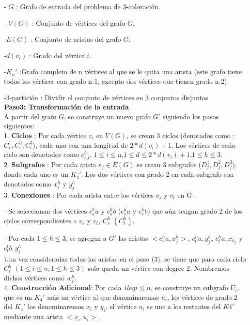 \documentclass[
10pt, %
a4paper, %
oneside, %
headinclude,footinclude, %
BCOR5mm, %
]{scrartcl}
\begin{document}
- $G$ : Grafo de entrada del problema de 3-coloración.

- $V(G)$ : Conjunto de vértices del grafo $G$.

-$E(G)$ : Conjunto de aristas del grafo $G$. 

-$d(v_i)$ : Grado del vértice $i$.

-$K_n'$ :Grafo completo de n vértices al que se le quita una arista (este grafo tiene todos los vértices con grado n-1, excepto dos vértices que tienen grado n-2).

-3-partición : Dividir el conjunto de vértices en 3 conjuntos disjuntos.\\



\textbf{Paso3: Transformación de la entrada  }\\

A partir del grafo $G$, se construye un nuevo grafo $G'$ siguiendo los pasos siguientes:\\

1. \textbf{Ciclos} : Por cada vértice $v_i$ en $V(G)$, se crean 3 ciclos (denotados como : $C^1_i, C^2_i, C^3_i$), 
cada uno con una longitud de $2*d(v_i) + 1$. Los vértices de cada ciclo son denotados como $c^h_i_j$, $1 \leq i \leq n$,$ 1 \leq d \leq 2*d(v_i) + 1$,$ 1 \leq h \leq 3 $.\\

2. \textbf{Subgrafos} : Por cada arista $e_j \in E(G)$ se crean 3 subgrafos ($D^1_j, D^2_j, D^3_j$), donde cada uno es un $K_4'$. Los dos vértices con grado 2 en cada 
subgrafo son denotados como $x^h_i$ y $y^h_j$\\

3. \textbf{Conexiones} : Por cada arista entre los vértices $v_s$ y $v_t$ en G :

- Se seleccionan dos vértices $c^h_sa$ y $c^h_sb$ ($c^h_sa$ y $c^h_sb$) que aún tengan grado 2 de los ciclos correspondientes a $v_s$ y $v_t$, $C^h_s$ $(C^h_t)$.

- Por cada $1\leq h \leq 3$, se agregan a $G'$ las aristas $<c^h_sa,x^h_j>$, $c^h_ta,y^h_j$, $c^h_ta,x_h_j$ y $c^t_tb, y^h_j$\\

Una vez consideradas todas las aristas en
el paso (3), se tiene que para cada ciclo $C^h_i$ $( 1\leq i \leq n, 1 \leq h \leq 3 )$ solo queda un vértice con degree 2. Nombremos
dichos vértices como $w^h_i$.\\

4. \textbf{Construcción Adicional}: Por cada $1 leq i \leq n$, se construye un subgrafo $U_i$, que es un $K_4'$ más un vértice al que denominaremos $u_i$, los vértices de grado 2 del $K_4'$ los denominaremos 
$x_i$ y $y_i$, el vértice $u_i$ se une a los restantes del $K4'$ mediante una arista $<x_i, u_i>$. 
\end{document}
